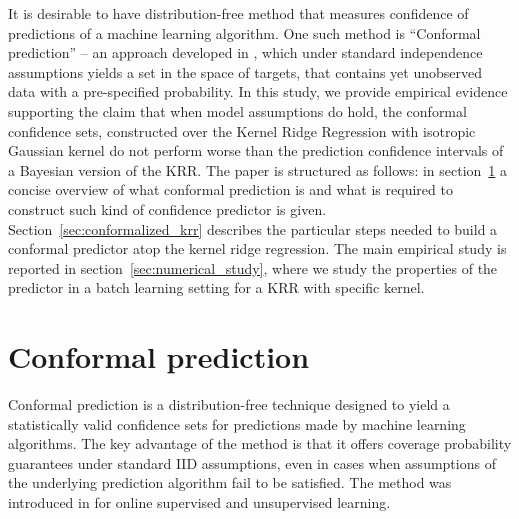 \documentclass[conference]{IEEEtran}
\begin{document}
It is desirable to have distribution-free method that measures confidence of predictions
of a machine learning algorithm. One such method is ``Conformal prediction'' -- an
approach developed in \cite{vovk2005}, which under standard independence assumptions
yields a set in the space of targets, that contains yet unobserved data with a pre-specified
probability. In this study, we provide empirical evidence supporting the claim that
when model assumptions do hold, the conformal confidence sets, constructed over the
Kernel Ridge Regression with isotropic Gaussian kernel do not perform worse than
the prediction confidence intervals of a Bayesian version of the KRR. The paper is
structured as follows: in section~\ref{sec:conformal_prediction} a concise overview
of what conformal prediction is and what is required to construct such kind of confidence
predictor is given. Section~\ref{sec:conformalized_krr} describes the particular steps
needed to build a conformal predictor atop the kernel ridge regression. The main
empirical study is reported in section~\ref{sec:numerical_study}, where we study the
properties of the predictor in a batch learning setting for a KRR with specific kernel. 


\section{Conformal prediction} %
\label{sec:conformal_prediction}

Conformal prediction is a distribution-free technique designed to yield a statistically
valid confidence sets for predictions made by machine learning algorithms. The key
advantage of the method is that it offers coverage probability guarantees under
standard IID assumptions, even in cases when assumptions of the underlying prediction
algorithm fail to be satisfied. The method was introduced in \cite{vovk2005} for online
supervised and unsupervised learning.
\end{document}
